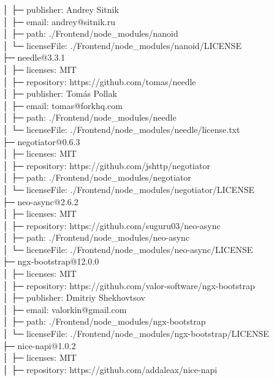 \documentclass[
    paper=a4,
    twoside=false,
    parskip=half,
    listof=entryprefix,
    listof=totoc,
    index=totoc,
    bibliography=totoc,
    headsepline,
]{scrbook}
\begin{document}
    │  ├─ publisher: Andrey Sitnik\\
    │  ├─ email: andrey@sitnik.ru\\
    │  ├─ path: ./Frontend/node\_modules/nanoid\\
    │  └─ licenseFile: ./Frontend/node\_modules/nanoid/LICENSE\\
    ├─ needle@3.3.1\\
    │  ├─ licenses: MIT\\
    │  ├─ repository: https://github.com/tomas/needle\\
    │  ├─ publisher: Tomás Pollak\\
    │  ├─ email: tomas@forkhq.com\\
    │  ├─ path: ./Frontend/node\_modules/needle\\
    │  └─ licenseFile: ./Frontend/node\_modules/needle/license.txt\\
    ├─ negotiator@0.6.3\\
    │  ├─ licenses: MIT\\
    │  ├─ repository: https://github.com/jshttp/negotiator\\
    │  ├─ path: ./Frontend/node\_modules/negotiator\\
    │  └─ licenseFile: ./Frontend/node\_modules/negotiator/LICENSE\\
    ├─ neo-async@2.6.2\\
    │  ├─ licenses: MIT\\
    │  ├─ repository: https://github.com/suguru03/neo-async\\
    │  ├─ path: ./Frontend/node\_modules/neo-async\\
    │  └─ licenseFile: ./Frontend/node\_modules/neo-async/LICENSE\\
    ├─ ngx-bootstrap@12.0.0\\
    │  ├─ licenses: MIT\\
    │  ├─ repository: https://github.com/valor-software/ngx-bootstrap\\
    │  ├─ publisher: Dmitriy Shekhovtsov\\
    │  ├─ email: valorkin@gmail.com\\
    │  ├─ path: ./Frontend/node\_modules/ngx-bootstrap\\
    │  └─ licenseFile: ./Frontend/node\_modules/ngx-bootstrap/LICENSE\\
    ├─ nice-napi@1.0.2\\
    │  ├─ licenses: MIT\\
    │  ├─ repository: https://github.com/addaleax/nice-napi\\
\end{document}
